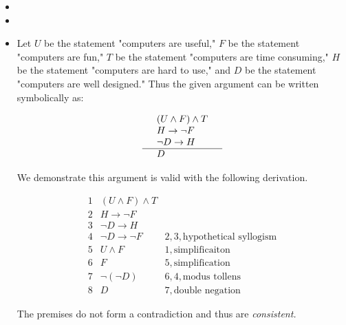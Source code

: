 \documentclass{article}
\theoremstyle{definition}
\begin{document}
	\begin{itemize}
		\item[(2)]
		\item[(4)]
		\item[(5)] Let $U$ be the statement "computers are useful," $F$ be the
		statement "computers are fun," $T$ be the statement "computers are
		time consuming," $H$ be the statement "computers are hard to use,"
		and $D$ be the statement "computers are well designed." Thus the
		given argument can be written symbolically as:

		$$\begin{array}{llr}
			  & (U\wedge F)\wedge T &\\
			  & H\rightarrow \neg F&\\
			  & \neg D\rightarrow H &\\\hline
			  & D &
		\end{array}$$

		We demonstrate this argument is valid with the following derivation.

		$$\begin{array}{llr}
			  1  & (U\wedge F)\wedge T &\\
			  2 & H\rightarrow \neg F&\\
			  3 & \neg D\rightarrow H &\\\hline 4 & \neg D \rightarrow \neg F & 2,
			  3, \mbox{hypothetical syllogism}\\
			  5 & U\wedge F & 1, \mbox{simplificaiton}\\
			  6 & F & 5, \mbox{simplification}\\
			  7 & \neg(\neg D) & 6, 4, \mbox{modus tollens}\\
			  8 & D & 7, \mbox{double negation}
		\end{array}$$

		The premises do not form a contradiction and thus are \emph{consistent.}
	\end{itemize}

	\vspace{.5cm}

\end{document}
